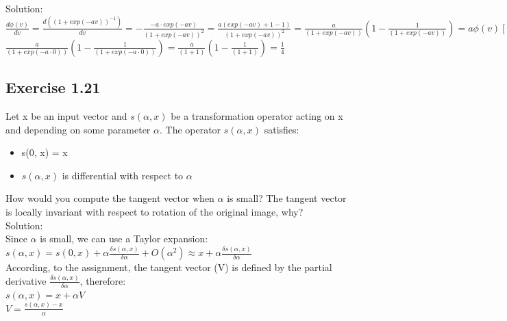 \documentclass[a4paper, 12pt]{article}
\begin{document}
Solution:\\

$\frac{d\phi(v)}{dv} = \frac{d((1 + exp(-av))^{-1})}{dv} = -\frac{-a\cdot exp(-av)}{(1 + exp(-av))^2} = \frac{a(exp(-av) + 1 -1)}{(1 + exp(-av))^2} = \frac{a}{(1 + exp(-av))} (1 - \frac{1}{(1 + exp(-av))}) = a\phi(v)[1 - \phi(v)]$\\

$\frac{a}{(1 + exp(-a\cdot 0))} (1 - \frac{1}{(1 + exp(-a\cdot 0))}) = \frac{a}{(1 + 1)} (1 - \frac{1}{(1 + 1)}) = \frac{1}{4}$


\subsection{Exercise 1.21}
Let x be an input vector and $s(\alpha, x)$ be a transformation operator acting on x and depending on some parameter $\alpha$. The operator $s(\alpha, x)$ satisfies:
\begin{itemize}
\item s(0, x) = x
\item $s(\alpha, x)$ is differential with respect to $\alpha$
\end{itemize}
How would you compute the tangent vector when $\alpha$ is small? The tangent vector is locally invariant with respect to rotation of the original image, why?\\

Solution:\\

Since $\alpha$ is small, we can use a Taylor expansion: $s(\alpha, x) = s(0, x) + \alpha \frac{\delta s(\alpha, x)}{\delta \alpha} + O(\alpha^2) \approx x + \alpha \frac{\delta s(\alpha, x)}{\delta \alpha}$\\

According, to the assignment, the tangent vector (V) is defined by the partial derivative $\frac{\delta s(\alpha, x)}{\delta \alpha}$, therefore:\\

$s(\alpha, x) =  x + \alpha V$\\

$V = \frac{s(\alpha, x) -  x}{\alpha}$\\
\end{document}
